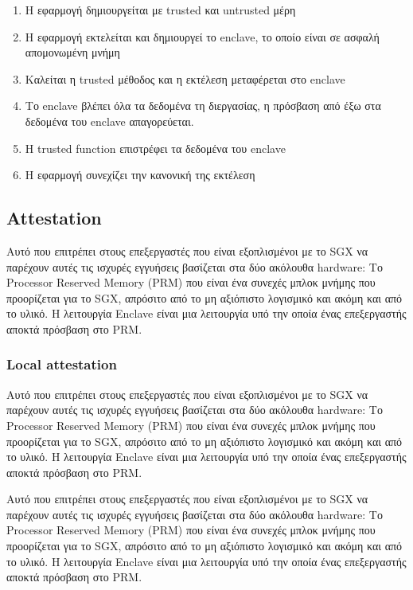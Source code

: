 \begin{enumerate}
   \item Η εφαρμογή δημιουργείται με trusted και untrusted μέρη
   \item Η εφαρμογή εκτελείται και δημιουργεί το enclave, το οποίο είναι σε ασφαλή απομονωμένη μνήμη
\item Καλείται η trusted μέθοδος και η εκτέλεση μεταφέρεται στο enclave
\item Το enclave βλέπει όλα τα δεδομένα τη διεργασίας, η πρόσβαση από έξω στα δεδομένα του enclave απαγορεύεται.
\item Η trusted function επιστρέφει τα δεδομένα του enclave
\item Η εφαρμογή συνεχίζει την κανονική της εκτέλεση
 \end{enumerate}




\subsection{Attestation}
Αυτό που επιτρέπει στους επεξεργαστές που είναι εξοπλισμένοι με το SGX να παρέχουν αυτές τις ισχυρές εγγυήσεις βασίζεται στα δύο ακόλουθα hardware: Το Processor Reserved Memory (PRM) που είναι ένα συνεχές μπλοκ μνήμης που προορίζεται για το SGX, απρόσιτο από το μη αξιόπιστο λογισμικό και ακόμη και από το υλικό. Η λειτουργία Enclave είναι μια λειτουργία υπό την οποία ένας επεξεργαστής αποκτά πρόσβαση στο PRM.

\subsubsection{Local attestation}

Αυτό που επιτρέπει στους επεξεργαστές που είναι εξοπλισμένοι με το SGX να παρέχουν αυτές τις ισχυρές εγγυήσεις βασίζεται στα δύο ακόλουθα hardware: Το Processor Reserved Memory (PRM) που είναι ένα συνεχές μπλοκ μνήμης που προορίζεται για το SGX, απρόσιτο από το μη αξιόπιστο λογισμικό και ακόμη και από το υλικό. Η λειτουργία Enclave είναι μια λειτουργία υπό την οποία ένας επεξεργαστής αποκτά πρόσβαση στο PRM.

Αυτό που επιτρέπει στους επεξεργαστές που είναι εξοπλισμένοι με το SGX να παρέχουν αυτές τις ισχυρές εγγυήσεις βασίζεται στα δύο ακόλουθα hardware: Το Processor Reserved Memory (PRM) που είναι ένα συνεχές μπλοκ μνήμης που προορίζεται για το SGX, απρόσιτο από το μη αξιόπιστο λογισμικό και ακόμη και από το υλικό. Η λειτουργία Enclave είναι μια λειτουργία υπό την οποία ένας επεξεργαστής αποκτά πρόσβαση στο PRM.

